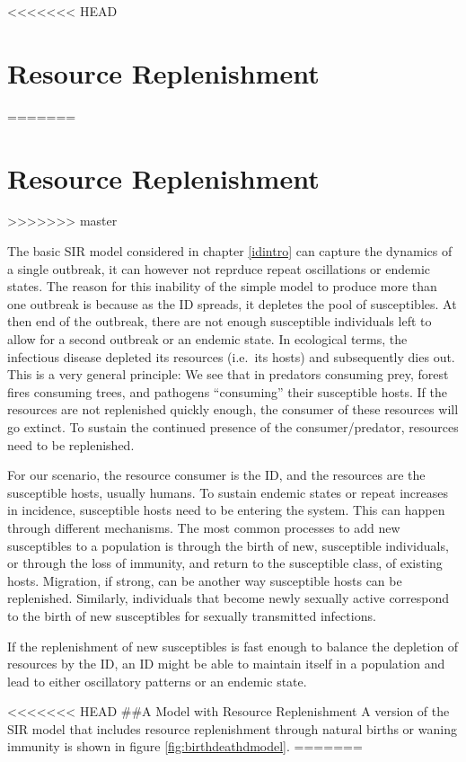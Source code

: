 \documentclass[]{book}
\theoremstyle{definition}
\theoremstyle{definition}
\theoremstyle{definition}
\theoremstyle{remark}
\begin{document}
<<<<<<< HEAD
\hypertarget{resource-replenishment}{%
\section{Resource Replenishment}\label{resource-replenishment}}
=======
\section{Resource Replenishment}\label{resource-replenishment}
>>>>>>> master

The basic SIR model considered in chapter \ref{idintro} can capture the
dynamics of a single outbreak, it can however not reprduce repeat
oscillations or endemic states. The reason for this inability of the
simple model to produce more than one outbreak is because as the ID
spreads, it depletes the pool of susceptibles. At then end of the
outbreak, there are not enough susceptible individuals left to allow for
a second outbreak or an endemic state. In ecological terms, the
infectious disease depleted its resources (i.e.~its hosts) and
subsequently dies out. This is a very general principle: We see that in
predators consuming prey, forest fires consuming trees, and pathogens
``consuming'' their susceptible hosts. If the resources are not
replenished quickly enough, the consumer of these resources will go
extinct. To sustain the continued presence of the consumer/predator,
resources need to be replenished.

For our scenario, the resource consumer is the ID, and the resources are
the susceptible hosts, usually humans. To sustain endemic states or
repeat increases in incidence, susceptible hosts need to be entering the
system. This can happen through different mechanisms. The most common
processes to add new susceptibles to a population is through the birth
of new, susceptible individuals, or through the loss of immunity, and
return to the susceptible class, of existing hosts. Migration, if
strong, can be another way susceptible hosts can be replenished.
Similarly, individuals that become newly sexually active correspond to
the birth of new susceptibles for sexually transmitted infections.

If the replenishment of new susceptibles is fast enough to balance the
depletion of resources by the ID, an ID might be able to maintain itself
in a population and lead to either oscillatory patterns or an endemic
state.

<<<<<<< HEAD
\#\#A Model with Resource Replenishment A version of the SIR model that
includes resource replenishment through natural births or waning
immunity is shown in figure \ref{fig:birthdeathdmodel}.
=======
\end{document}
